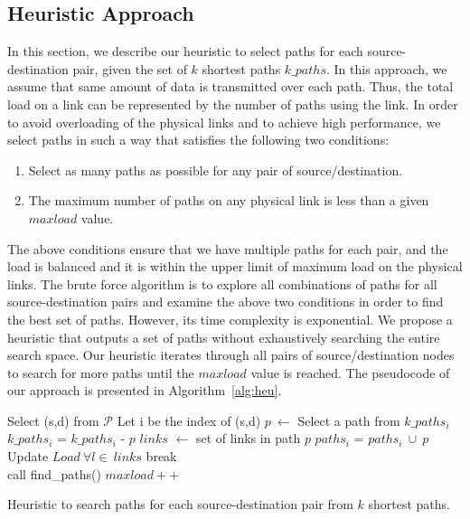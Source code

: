 \subsection{Heuristic Approach}
\label{sec:heuristic}

In this section, we describe our heuristic to select paths for each source-destination pair, given the set of $k$ shortest paths $k\_paths$. In this approach, we assume that same amount of data is transmitted over each path. Thus, the total load on a link can be represented by the number of paths using the link. In order to avoid overloading of the physical links and to achieve high performance, we select paths in such a way that satisfies the following two conditions:
\begin{enumerate}
\item Select as many paths as possible for any pair of source/destination. 
\item The maximum number of paths on any physical link is less than a given $maxload$ value.
\end{enumerate}
The above conditions ensure that we have multiple paths for each pair, and the load is balanced and it is within the upper limit of maximum load on the physical links. The brute force algorithm is to explore all combinations of paths for all source-destination pairs and examine the above two conditions in order to find the best set of paths. However, its time complexity is exponential. We propose a heuristic that outputs a set of paths without exhaustively searching the entire search space. Our heuristic iterates through all pairs of source/destination nodes to search for more paths until the $maxload$ value is reached. The pseudocode of our approach is presented in Algorithm~\ref{alg:heu}. 
\begin{algorithm}[!htbp]
	{
		Select (s,d) from $\mathcal{P}$\; 
		Let i be the index of (s,d) \;
		$p~\leftarrow$ Select a path from $k\_paths_i$ \;
		$k\_paths_i$ = $k\_paths_i$ - {$p$} \;
		{$links$} $\leftarrow$ set of links in path $p$ \;
		{
			$paths_i$ = $paths_i~\cup~{p}$ \;
			Update $Load~\forall l\in~links$ \;
		} %
		{
			break \;
		} %
	} %
~\\
	{
		call find\_paths() \; 
		$maxload ++$ \;
	} %
\caption{Heuristic to search paths for each source-destination pair from $k$ shortest paths.}
\label{alg:heu}
\end{algorithm}
